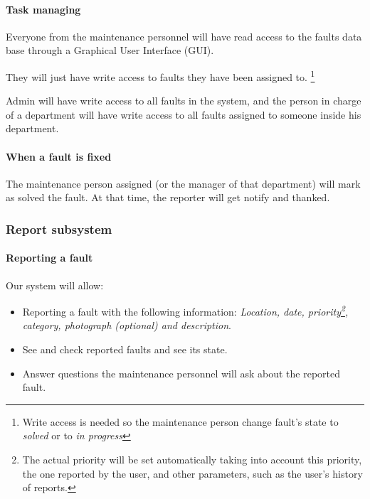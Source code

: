 \paragraph{Task managing} Everyone from the maintenance personnel will have read access to the faults data base through a Graphical User Interface (GUI).

They will just have write access to faults they have been assigned to. \footnote{Write access is needed so the maintenance person change fault's state to \textit{solved} or to \textit{in progress}}

Admin will have write access to all faults in the system, and the person in charge of a department will have write access to all faults assigned to someone inside his department.

\paragraph{When a fault is fixed} The maintenance person assigned (or the manager of that department) will mark as solved the fault. At that time, the reporter will get notify and thanked.


\subsubsection{Report subsystem}

\paragraph{Reporting a fault} Our system will allow:

\begin{itemize}
\item Reporting a fault with the following information: \textit{Location, date, priority\footnote{The actual priority will be set automatically taking into account this priority, the one reported by the user, and other parameters, such as the user's history of reports.}, category, photograph (optional) and description}.

\item See and check reported faults and see its state.

\item Answer questions the maintenance personnel will ask about the reported fault.
\end{itemize}


